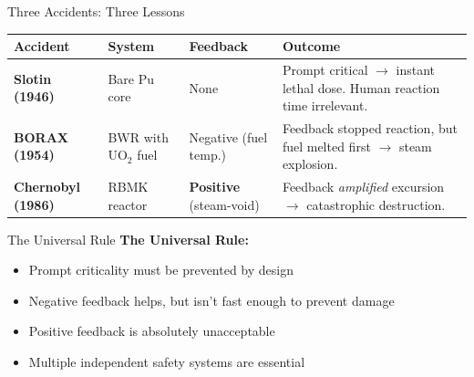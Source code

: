 \documentclass[aspectratio=169]{beamer}
\begin{document}
\begin{frame}[allowframebreaks]{Three Accidents: Three Lessons}
    \small
    \begin{tabular}{p{2.5cm}p{3.2cm}p{3.2cm}p{3.8cm}}
        \toprule
        \textbf{Accident} & \textbf{System} & \textbf{Feedback} & \textbf{Outcome} \\
        \midrule
        \textbf{Slotin (1946)} & Bare Pu core & None & Prompt critical $\rightarrow$ instant lethal dose. Human reaction time irrelevant. \\
        \addlinespace
        \textbf{BORAX (1954)} & BWR with UO$_2$ fuel & Negative (fuel temp.) & Feedback stopped reaction, but fuel melted first $\rightarrow$ steam explosion. \\
        \addlinespace
        \textbf{Chernobyl (1986)} & RBMK reactor & \textbf{Positive} (steam-void) & Feedback \textit{amplified} excursion $\rightarrow$ catastrophic destruction. \\
        \bottomrule
    \end{tabular}

    \vspace{1em}
\end{frame}

\begin{frame}[allowframebreaks]{The Universal Rule}
    \textbf{The Universal Rule:}
    \begin{itemize}
        \item Prompt criticality must be prevented by design
        \item Negative feedback helps, but isn't fast enough to prevent damage
        \item Positive feedback is absolutely unacceptable
        \item Multiple independent safety systems are essential
    \end{itemize}
\end{frame}
\end{document}

